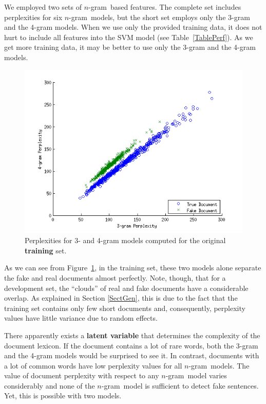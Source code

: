 \documentclass[11pt]{article}
\newcommand{\ngram}{\mbox{$n$-gram }}
\begin{document}
We employed two sets of \ngram based features. The complete set includes perplexities for six \ngram models,
but the short set employs only the 3-gram and the 4-gram models.
When we use only the provided training data, it does not hurt to include all features into the SVM
model (see Table~\ref{TablePerf}). As we get more training data, it may be better to use only
the 3-gram and the 4-gram models.

\begin{figure}\centering
\includegraphics[scale=0.4]{erroranalysisGram34.png}
\caption{Perplexities for 3- and 4-gram models computed for the original \textbf{training} set.\label{Fig1}}
\end{figure}

As we can see from Figure~\ref{Fig1},
in the training set,
these two models alone separate the fake and real documents almost perfectly.
Note, though, that for a development set, the ``clouds'' of real and fake documents have a considerable overlap.
 As explained in Section \ref{SectGen}, this is due to the fact that the training set
contains only few short documents and, consequently, perplexity values have little variance due to random effects.

There apparently exists a \textbf{latent variable} that determines the complexity
of the document lexicon.
If the document contains a lot of rare words, both the 3-gram and the 4-gram models
would be surprised to see it. In contrast, documents with a lot of common words
have low perplexity values for all \ngram models.
The value of document perplexity with respect to any \ngram model varies considerably
and none of the \ngram model is sufficient to detect fake sentences.
Yet, this is possible with two models.
\end{document}

